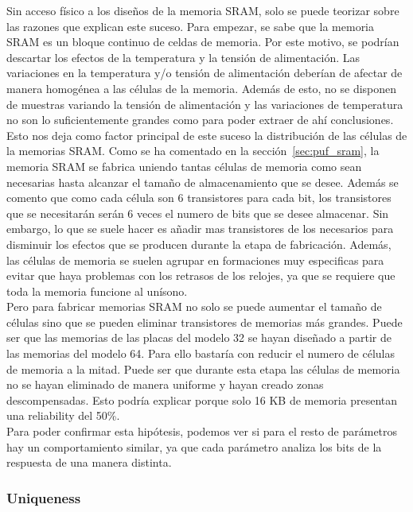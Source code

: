 \documentclass[spanish]{template/minim}
\begin{document}
Sin acceso físico a los diseños de la memoria SRAM, solo se puede teorizar sobre las razones que explican este suceso. Para empezar, se sabe que la memoria SRAM es un bloque continuo de celdas de memoria. Por este motivo, se podrían descartar los efectos de la temperatura y la tensión de alimentación. Las variaciones en la temperatura y/o tensión de alimentación deberían de afectar de manera homogénea a las células de la memoria. Además de esto, no se disponen de muestras variando la tensión de alimentación y las variaciones de temperatura no son lo suficientemente grandes como para poder extraer de ahí conclusiones.\\

Esto nos deja como factor principal de este suceso la distribución de las células de la memorias SRAM. Como se ha comentado en la sección~\ref{sec:puf_sram}, la memoria SRAM se fabrica uniendo tantas células de memoria como sean necesarias hasta alcanzar el tamaño de almacenamiento que se desee. Además se comento que como cada célula son 6 transistores para cada bit, los transistores que se necesitarán serán 6 veces el numero de bits que se desee almacenar. Sin embargo, lo que se suele hacer es añadir mas transistores de los necesarios para disminuir los efectos que se producen durante la etapa de fabricación. Además, las células de memoria se suelen agrupar en formaciones muy especificas para evitar que haya problemas con los retrasos de los relojes, ya que se requiere que toda la memoria funcione al unísono.\\

Pero para fabricar memorias SRAM no solo se puede aumentar el tamaño de células sino que se pueden eliminar transistores de memorias más grandes. Puede ser que las memorias de las placas del modelo 32 se hayan diseñado a partir de las memorias del modelo 64. Para ello bastaría con reducir el numero de células de memoria a la mitad. Puede ser que durante esta etapa las células de memoria no se hayan eliminado de manera uniforme y hayan creado zonas descompensadas. Esto podría explicar porque solo 16 KB de memoria presentan una reliability del 50\%.\\

Para poder confirmar esta hipótesis, podemos ver si para el resto de parámetros hay un comportamiento similar, ya que cada parámetro analiza los bits de la respuesta de una manera distinta.\\

\subsubsection{Uniqueness}\label{sec:uniqueness}
\end{document}
